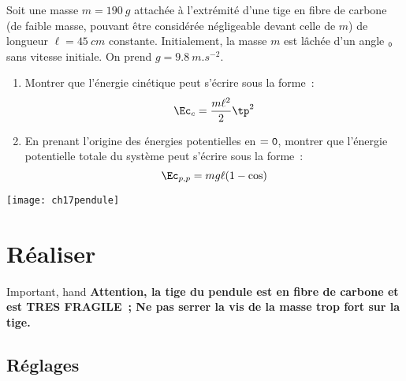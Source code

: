\documentclass[a4paper, 11pt, final, garamond]{book}
\begin{document}
\begin{minipage}{0.64\linewidth}
    Soit une masse $m = \SI{190}{g}$ attachée à l'extrémité d'une tige en fibre
    de carbone (de faible masse, pouvant être considérée négligeable devant
    celle de $m$) de longueur $\ell = \SI{45}{cm}$ constante. Initialement, la
    masse $m$ est lâchée d'un angle $\tt_0$ sans vitesse initiale. On prend $g =
    \SI{9,8}{m.s^{-2}}$. \bigbreak
    \begin{enumerate}[label=\clenumi]
        \item Montrer que l'énergie cinétique peut s'écrire sous la forme~: 
            \[
                \Ec_c = \frac{m\ell^2}{2}\tp^2
            \]

        \item En prenant l'origine des énergies potentielles en $\tt = 0$,
            montrer que l'énergie potentielle totale du système peut s'écrire
            sous la forme~:
            \[
                \Ec_{p,p} = mg\ell (1-\cos\tt)
            \]
    \end{enumerate}
\end{minipage}
\hfill
\begin{minipage}{0.34\linewidth}
    \begin{center}
        \texttt{[image: ch17pendule]}
    \end{center}
\end{minipage}

\section{Réaliser}

\begin{tror}{Important, hand}
    \bfseries
    Attention, la tige du pendule est en fibre de carbone et est TRES FRAGILE~;
    Ne pas serrer la vis de la masse trop fort sur la tige.
\end{tror}

\subsection{Réglages}
\end{document}
